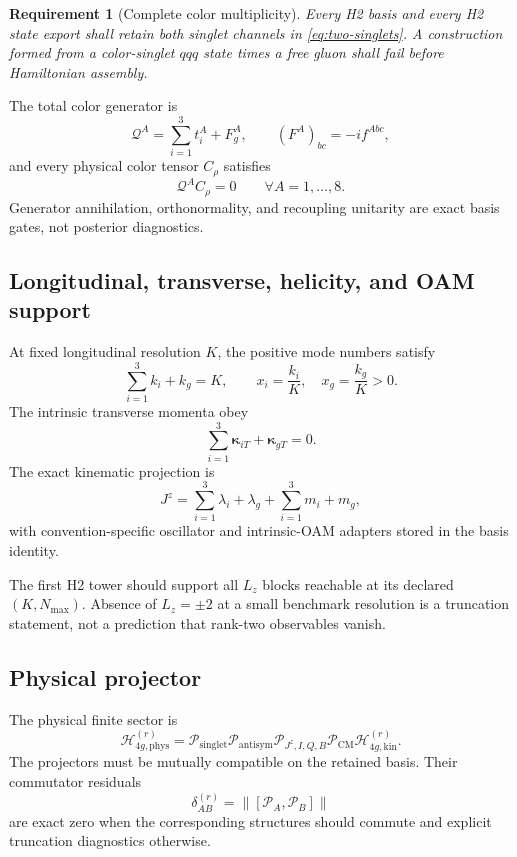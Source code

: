 \documentclass[11pt]{article}
\newtheorem{requirement}[definition]{Requirement}
\newcommand{\Hil}{\mathcal H}
\newcommand{\cQ}{\mathcal Q}
\newcommand{\cP}{\mathcal P}
\newcommand{\norm}[1]{\left\lVert#1\right\rVert}
\newcommand{\phys}{\mathrm{phys}}
\newcommand{\COM}{\mathrm{CM}}
\newcommand{\Jz}{J^z}
\begin{document}
\begin{requirement}[Complete color multiplicity]
Every H2 basis and every H2 state export shall retain both singlet channels in
\cref{eq:two-singlets}.  A construction formed from a color-singlet \(qqq\)
state times a free gluon shall fail before Hamiltonian assembly.
\end{requirement}

The total color generator is
\begin{equation}
 \cQ^A
 =
 \sum_{i=1}^{3}t_i^A+F_g^A,
 \qquad
 (F^A)_{bc}=-if^{Abc},
\end{equation}
and every physical color tensor \(C_{\rho}\) satisfies
\begin{equation}
 \cQ^A C_{\rho}=0
 \qquad\forall A=1,\ldots,8.
\end{equation}
Generator annihilation, orthonormality, and recoupling unitarity are exact
basis gates, not posterior diagnostics.

\subsection{Longitudinal, transverse, helicity, and OAM support}

At fixed longitudinal resolution \(K\), the positive mode numbers satisfy
\begin{equation}
 \sum_{i=1}^{3}k_i+k_g=K,
 \qquad
 x_i=\frac{k_i}{K},
 \quad
 x_g=\frac{k_g}{K}>0.
\end{equation}
The intrinsic transverse momenta obey
\begin{equation}
 \sum_{i=1}^{3}\bm\kappa_{iT}+\bm\kappa_{gT}=0.
\end{equation}
The exact kinematic projection is
\begin{equation}
 \Jz
 =
 \sum_{i=1}^{3}\lambda_i+\lambda_g+
 \sum_{i=1}^{3}m_i+m_g,
 \label{eq:jz-ledger}
\end{equation}
with convention-specific oscillator and intrinsic-OAM adapters stored in the
basis identity.

The first H2 tower should support all \(L_z\) blocks reachable at its declared
\((K,N_{\max})\).  Absence of \(L_z=\pm2\) at a small benchmark resolution is
a truncation statement, not a prediction that rank-two observables vanish.

\subsection{Physical projector}

The physical finite sector is
\begin{equation}
 \Hil_{4g,\phys}^{(r)}
 =
 \cP_{\mathrm{singlet}}
 \cP_{\mathrm{antisym}}
 \cP_{\Jz,I,Q,B}
 \cP_{\COM}
 \Hil_{4g,\mathrm{kin}}^{(r)}.
\end{equation}
The projectors must be mutually compatible on the retained basis.  Their
commutator residuals
\begin{equation}
 \delta_{AB}^{(r)}
 =
 \norm{[\cP_A,\cP_B]}
\end{equation}
are exact zero when the corresponding structures should commute and explicit
truncation diagnostics otherwise.
\end{document}

